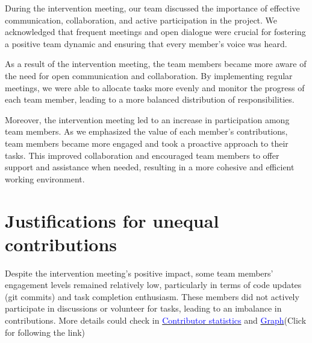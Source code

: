 \documentclass[a4paper]{article}
\begin{document}
During the intervention meeting, our team discussed the importance of effective communication, collaboration, and active participation in the project. We acknowledged that frequent meetings and open dialogue were crucial for fostering a positive team dynamic and ensuring that every member's voice was heard.

As a result of the intervention meeting, the team members became more aware of the need for open communication and collaboration. By implementing regular meetings, we were able to allocate tasks more evenly and monitor the progress of each team member, leading to a more balanced distribution of responsibilities.

Moreover, the intervention meeting led to an increase in participation among team members. As we emphasized the value of each member's contributions, team members became more engaged and took a proactive approach to their tasks. This improved collaboration and encouraged team members to offer support and assistance when needed, resulting in a more cohesive and efficient working environment.

\section*{Justifications for unequal contributions}

Despite the intervention meeting's positive impact, some team members' engagement levels remained relatively low, particularly in terms of code updates (git commits) and task completion enthusiasm. These members did not actively participate in discussions or volunteer for tasks, leading to an imbalance in contributions. More details could check in \href{https://git.cs.bham.ac.uk/team-projects-2022-23/team23-22/-/graphs/main?ref_type=heads}{\textcolor{blue}{Contributor statistics}} and \href{https://git.cs.bham.ac.uk/team-projects-2022-23/team23-22/-/network/main?ref_type=heads}{\textcolor{blue}{Graph}}(Click for following the link)
\end{document}
